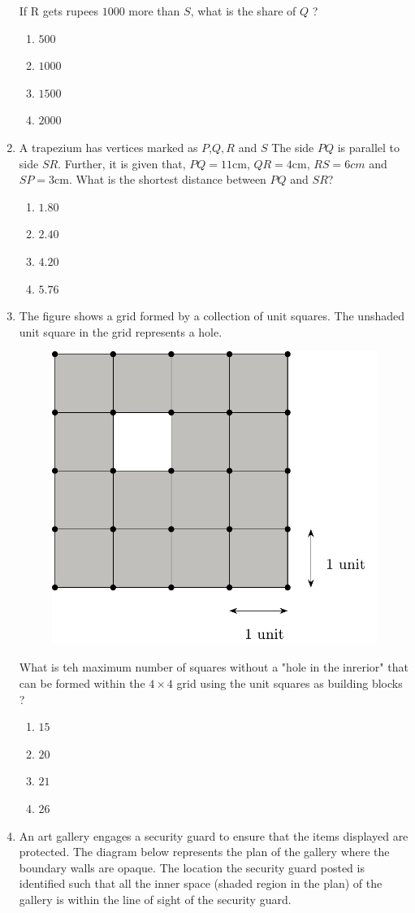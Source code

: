 \documentclass[journal]{IEEEtran}
\begin{document}
\begin{enumerate}
       If R gets rupees $1000$ more than $S$, what is the share of $Q$ ?
            \begin{enumerate}
                  \item $500$
                  \item $1000$
                  \item $1500$
                  \item $2000$
            \end{enumerate}
       \item A trapezium has vertices marked as $P$,$Q, R$ and $S$ The side $PQ$ is parallel to side $SR$. Further, it is given that, $PQ=11$cm, $QR=4$cm, $RS= 6cm$ and $SP=3$cm. What is the shortest distance between $PQ$ and $SR$?
            \begin{enumerate}
                \item $1.80$
                \item $2.40$
                \item $4.20$
                \item $5.76$
            \end{enumerate}
 	\item The figure shows a grid formed by a collection of unit squares. The unshaded unit square in the grid represents a hole.
        \begin{figure}[ht!]
	    \centering
	    \includegraphics[width=0.5\linewidth]{fig/fig1.pdf}
	\end{figure}

	What is teh maximum number of squares without a "hole in the inrerior" that can be formed within the $4 \times 4$ grid using the unit squares as building blocks ?
             \begin{enumerate}
                   \item $15$
                   \item $20$
                   \item $21$
                   \item $26$
             \end{enumerate}
       \item An art gallery engages a security guard to ensure that the items displayed are protected. The diagram below represents the plan of the gallery where the boundary walls are opaque. The location the security guard posted is identified such that all the inner space (shaded region in the plan) of the gallery is within the line of sight of the security guard.


\end{enumerate}
\end{document}
